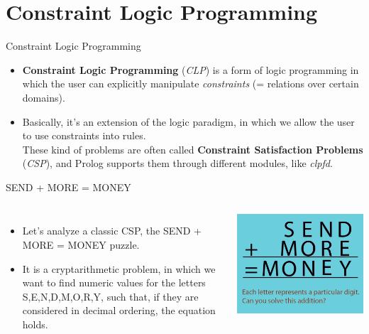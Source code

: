 \section{Constraint Logic Programming}
\begin{frame}{Constraint Logic Programming}

\begin{itemize}
\setlength\itemsep{2em}
\item \textbf{Constraint Logic Programming} (\emph{CLP}) is a form of logic programming in which the user can explicitly manipulate \emph{constraints} (= relations over certain domains).\\
\item Basically, it's an extension of the logic paradigm, in which we allow the user to use constraints into rules.\\
These kind of problems are often called \textbf{Constraint Satisfaction Problems} (\emph{CSP}), and Prolog supports them through different modules, like \emph{clpfd}.
\end{itemize}

\end{frame}

\begin{frame}{SEND + MORE = MONEY}
\begin{columns}
        	\begin{itemize}
			\item Let's analyze a classic CSP, the SEND + MORE = MONEY puzzle.\\
			\item It is a cryptarithmetic problem, in which we want to find numeric values for the letters S,E,N,D,M,O,R,Y, such that, if they are considered in decimal ordering, the equation holds.
			\end{itemize}

			\includegraphics[scale=0.2]{img/money.jpg}
	\end{columns}
\end{frame}


